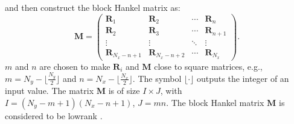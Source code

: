 and then construct the block Hankel matrix as:
\begin{equation}
\label{eq:hankel2}
\mathbf{M}=\left(\begin{array}{cccc}
\mathbf{R}_1 &\mathbf{R}_2 & \cdots &\mathbf{R}_n \\
\mathbf{R}_2 &\mathbf{R}_3 &\cdots &\mathbf{R}_{n+1} \\
\vdots & \vdots &\ddots &\vdots \\
\mathbf{R}_{N_x-n+1}&\mathbf{R}_{N_x-n+2} &\cdots&\mathbf{R}_{N_x}
\end{array}
\right).
\end{equation}
 $m$ and $n$ are chosen to make $\mathbf{R}_i$ and $\mathbf{M}$ close to square matrices, e.g., $m=N_y-\lfloor\frac{N_y}{2}\rfloor$ and $n=N_x-\lfloor\frac{N_x}{2}\rfloor$. The symbol $\lfloor\cdot \rfloor$ outputs the integer of an input value. The matrix $\mathbf{M}$ is of size $I\times J$, with $I=(N_y-m+1)(N_x-n+1)$, $J=mn$. The block Hankel matrix $\mathbf{M}$ is considered to be lowrank \cite[]{trickett2008,mssa,weilin2016dmssa,yangkang2019nc}. 

